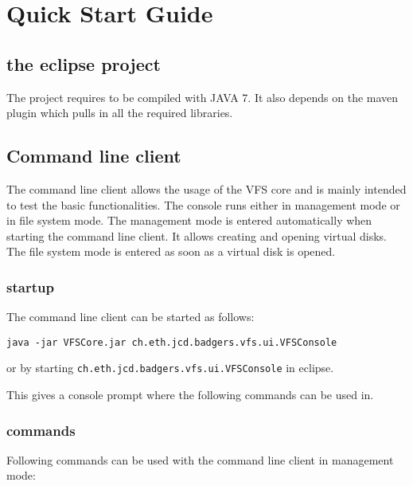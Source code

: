 

\section{Quick Start Guide}


\subsection{the eclipse project}
The project requires to be compiled with JAVA 7. It also depends on the maven
plugin which pulls in all the required libraries.

\subsection{Command line client}

The command line client allows the usage of the VFS core and is mainly intended
to test the basic functionalities. The console runs either in  management mode
or in file system mode. The management mode is entered automatically when
starting the command line client. It allows creating and opening virtual
disks. The file system mode is entered as soon as a virtual disk is opened.


\subsubsection{startup}
The command line client can be started as follows:

\begin{verbatim}
java -jar VFSCore.jar ch.eth.jcd.badgers.vfs.ui.VFSConsole
\end{verbatim}

or by starting \verb|ch.eth.jcd.badgers.vfs.ui.VFSConsole| in eclipse.



This gives a console prompt where the following commands can be used in.

\subsubsection{commands}
Following commands can be used with the command line client in management mode:

